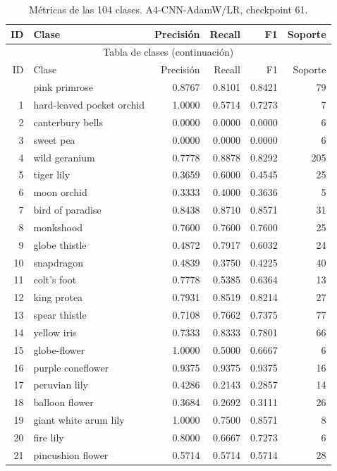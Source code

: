\small
\begin{longtable}{rlrrrr}
\caption{Métricas de las 104 clases. A4-CNN-AdamW/LR, checkpoint 61.}\label{tab:clases-completas}\\
\toprule ID & Clase & Precisión & Recall & F1 & Soporte \\ \midrule
\endfirsthead
\multicolumn{6}{c}{Tabla de clases (continuación)}\\
\toprule ID & Clase & Precisión & Recall & F1 & Soporte \\ \midrule
\endhead
\bottomrule
\endfoot
0 & pink primrose & 0.8767 & 0.8101 & 0.8421 & 79 \\
1 & hard-leaved pocket orchid & 1.0000 & 0.5714 & 0.7273 & 7 \\
2 & canterbury bells & 0.0000 & 0.0000 & 0.0000 & 6 \\
3 & sweet pea & 0.0000 & 0.0000 & 0.0000 & 6 \\
4 & wild geranium & 0.7778 & 0.8878 & 0.8292 & 205 \\
5 & tiger lily & 0.3659 & 0.6000 & 0.4545 & 25 \\
6 & moon orchid & 0.3333 & 0.4000 & 0.3636 & 5 \\
7 & bird of paradise & 0.8438 & 0.8710 & 0.8571 & 31 \\
8 & monkshood & 0.7600 & 0.7600 & 0.7600 & 25 \\
9 & globe thistle & 0.4872 & 0.7917 & 0.6032 & 24 \\
10 & snapdragon & 0.4839 & 0.3750 & 0.4225 & 40 \\
11 & colt's foot & 0.7778 & 0.5385 & 0.6364 & 13 \\
12 & king protea & 0.7931 & 0.8519 & 0.8214 & 27 \\
13 & spear thistle & 0.7108 & 0.7662 & 0.7375 & 77 \\
14 & yellow iris & 0.7333 & 0.8333 & 0.7801 & 66 \\
15 & globe-flower & 1.0000 & 0.5000 & 0.6667 & 6 \\
16 & purple coneflower & 0.9375 & 0.9375 & 0.9375 & 16 \\
17 & peruvian lily & 0.4286 & 0.2143 & 0.2857 & 14 \\
18 & balloon flower & 0.3684 & 0.2692 & 0.3111 & 26 \\
19 & giant white arum lily & 1.0000 & 0.7500 & 0.8571 & 8 \\
20 & fire lily & 0.8000 & 0.6667 & 0.7273 & 6 \\
21 & pincushion flower & 0.5714 & 0.5714 & 0.5714 & 28 \\

\end{longtable}
